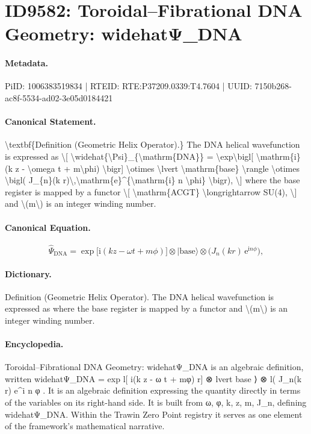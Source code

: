 \section*{ID9582: Toroidal–Fibrational DNA Geometry: widehatΨ\_DNA}
\paragraph{Metadata.}
PiID: 1006383519834 | RTEID: RTE:P37209.0339:T4.7604 | UUID: 7150b268-ac8f-5534-ad02-3e05d0184421

\paragraph{Canonical Statement.}
\textbackslash{}textbf\{Definition (Geometric Helix Operator).\} The DNA helical wavefunction is expressed as \textbackslash{}[ \textbackslash{}widehat\{\textbackslash{}Psi\}\_\{\textbackslash{}mathrm\{DNA\}\} = \textbackslash{}exp\textbackslash{}bigl[ \textbackslash{}mathrm\{i\}(k z - \textbackslash{}omega t + m\textbackslash{}phi) \textbackslash{}bigr] \textbackslash{}otimes \textbackslash{}lvert \textbackslash{}mathrm\{base\} \textbackslash{}rangle \textbackslash{}otimes \textbackslash{}bigl( J\_\{n\}(k r)\textbackslash{},\textbackslash{}mathrm\{e\}\textasciicircum{}\{\textbackslash{}mathrm\{i\} n \textbackslash{}phi\} \textbackslash{}bigr), \textbackslash{}] where the base register is mapped by a functor \textbackslash{}[ \textbackslash{}mathrm\{ACGT\} \textbackslash{}longrightarrow SU(4), \textbackslash{}] and \textbackslash{}(m\textbackslash{}) is an integer winding number.

\paragraph{Canonical Equation.}
\[
\widehat{\Psi}_{\mathrm{DNA}} = \exp\bigl[ \mathrm{i}(k z - \omega t + m\phi) \bigr] \otimes \lvert \mathrm{base} \rangle \otimes \bigl( J_{n}(k r)\,\mathrm{e}^{\mathrm{i} n \phi} \bigr),
\]

\paragraph{Dictionary.}
Definition (Geometric Helix Operator). The DNA helical wavefunction is expressed as where the base register is mapped by a functor and \textbackslash{}(m\textbackslash{}) is an integer winding number.

\paragraph{Encyclopedia.}
Toroidal–Fibrational DNA Geometry: widehatΨ\_DNA is an algebraic definition, written widehatΨ\_DNA = exp l[ i(k z - ω t + mφ) r] ⊗ lvert base ⟩ ⊗ l( J\_n(k r) e\textasciicircum{}i n φ . It is an algebraic definition expressing the quantity directly in terms of the variables on its right-hand side. It is built from ω, φ, k, z, m, J\_n, defining widehatΨ\_DNA. Within the Trawin Zero Point registry it serves as one element of the framework's mathematical narrative.
